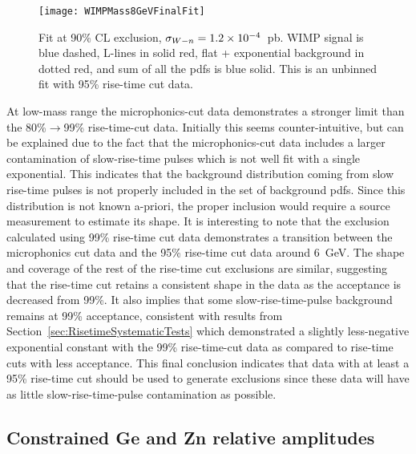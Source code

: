 			\begin{figure}
				\centering
				\texttt{[image: WIMPMass8GeVFinalFit]}
				\caption[Signal exclusion fit at 90\% CL.]
				{Fit at 90\% CL exclusion, $\sigma_{W-n} = 1.2 \times 10^{-4}$~pb.  
				WIMP signal is blue dashed, L-lines in solid red, flat + exponential background in dotted red, and 
				sum of all the pdfs is blue solid.
				This is an unbinned fit with 95\% rise-time cut data.  }
				\label{fig:WIMPFitExampleSigLikeBgd}
			\end{figure}

At low-mass range the microphonics-cut data demonstrates a stronger limit than the 80\%$\to$99\% rise-time-cut data.  Initially this seems counter-intuitive, but can be explained due to the fact that the microphonics-cut data includes a larger contamination of slow-rise-time pulses which is not well fit with a single exponential.  This indicates that the background distribution coming from slow rise-time pulses is not properly included in the set of background pdfs.  Since this distribution is not known a-priori, the proper inclusion would require a source measurement to estimate its shape.  It is interesting to note that the exclusion calculated using 99\% rise-time cut data demonstrates a transition between the microphonics cut data and the 95\% rise-time cut data around 6~GeV.  The shape and coverage of the rest of the rise-time cut exclusions are similar, suggesting that the rise-time cut retains a consistent shape in the data as the acceptance is decreased from 99\%.  It also implies that some slow-rise-time-pulse background remains at 99\% acceptance, consistent with results from Section~\ref{sec:RisetimeSystematicTests} which demonstrated a slightly less-negative exponential constant with the 99\% rise-time-cut data as compared to rise-time cuts with less acceptance.  This final conclusion indicates that data with at least a 95\% rise-time cut should be used to generate exclusions since these data will have as little slow-rise-time-pulse contamination as possible.  

		\subsection{Constrained Ge and Zn relative amplitudes}
		\label{sec:LimitsConstrained}
	
